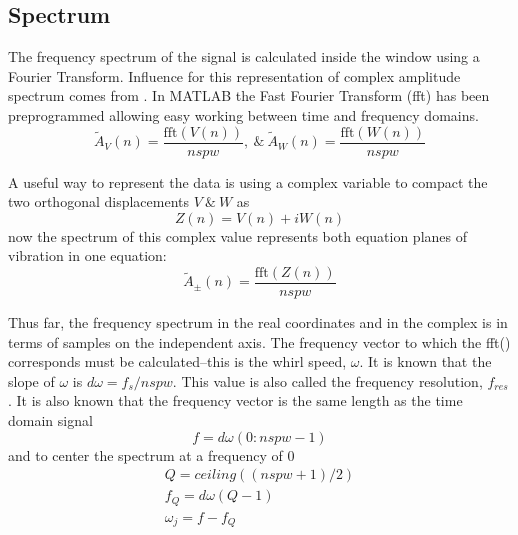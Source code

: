 \subsection{Spectrum}
The frequency spectrum of the signal is calculated inside the window using a Fourier Transform. Influence for this representation of complex amplitude spectrum comes from \cite{craig2006fundamentals}. In MATLAB the Fast Fourier Transform (fft) has been preprogrammed allowing easy working between time and frequency domains.
\begin{equation}\label{eq:FFTReal}
\tilde{A}_V(n) = \frac{\text{fft}(V(n))}{nspw},\ \&\ \tilde{A}_W(n) = \frac{\text{fft}(W(n))}{nspw}
\end{equation}\par 
A useful way to represent the data is using a complex variable to compact the two orthogonal displacements $ V\ \&\ W $ as
\begin{equation}\label{eq:ComplexDisplacement}
Z(n) = V(n) + iW(n)
\end{equation}
now the spectrum of this complex value represents both equation planes of vibration in one equation:
\begin{equation}\label{eq:FFTComplex}
\tilde{A}_\pm(n) = \frac{\text{fft}(Z(n))}{nspw}
\end{equation}\par
Thus far, the frequency spectrum in the real coordinates and in the complex is in terms of samples on the independent axis. The frequency vector to which the fft() corresponds must be calculated--this is the whirl speed, $ \omega $. It is known that the slope of $ \omega $ is $ d\omega=f_s/nspw $. This value is also called the frequency resolution, $ f_{res} $. It is also known that the frequency vector is the same length as the time domain signal 
\begin{equation*}
f=d\omega(0:nspw-1)
\end{equation*}
and to center the spectrum at a frequency of 0
\begin{equation*}
\begin{array}{c}
Q=ceiling((nspw+1)/2)\\
f_Q=d\omega(Q-1)\\
\omega_j=f-f_Q
\end{array}
\end{equation*}
